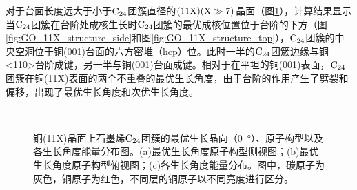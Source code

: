         对于台面长度远大于小于$\rm{C_{24}}$团簇直径的$\rm (11X)(X \gg 7 )$晶面（图\ref{fig:GO_C24_11X}），计算结果显示当$\rm{C_{24}}$团簇在台阶处成核生长时$\rm{C_{24}}$团簇的最优成核位置位于台阶的下方（图\ref{fig:GO_11X_structure_side}和图\ref{fig:GO_11X_structure_top}），$\rm{C_{24}}$团簇的中央空洞位于铜(001)台面的六方密堆（hcp）位。此时一半的$\rm{C_{24}}$团簇边缘与铜<110>台阶成键，另一半与铜(001)台面成键。相对于在平坦的铜(001)表面，$\rm{C_{24}}$团簇在铜(11X)表面的两个不重叠的最优生长角度，由于台阶的作用产生了劈裂和偏移，出现了最优生长角度和次优生长角度。

        \begin{figure}[!htb]
            \centering
            \\[-0.5ex]
            \caption{铜(11X)晶面上石墨烯$\rm{C_{24}}$团簇的最优生长晶向（\SI{0}{\degree}）、原子构型以及各生长角度能量分布图。(a)最优生长角度原子构型侧视图；(b)最优生长角度原子构型俯视图；(c)各生长角度能量分布。图中，碳原子为灰色，铜原子为红色，不同层的铜原子以不同亮度进行区分。}
            \label{fig:GO_C24_11X}
        \end{figure}

